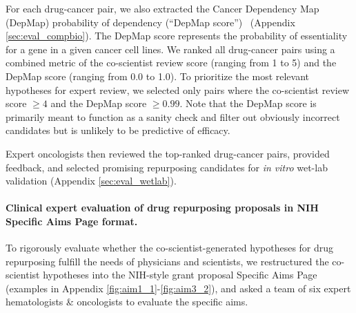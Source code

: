 For each drug-cancer pair, we also extracted the Cancer Dependency Map (DepMap) probability of dependency (``DepMap score'')~\citep{depmap2024} (Appendix \cref{sec:eval_compbio}). The DepMap score represents the probability of essentiality for a gene in a given cancer cell lines. We ranked all drug-cancer pairs using a combined metric of the co-scientist review score (ranging from 1 to 5) and the DepMap score (ranging from 0.0 to 1.0). To prioritize the most relevant hypotheses for expert review, we selected only pairs where the co-scientist review score $\geq 4$ and the DepMap score $\geq 0.99$. Note that the DepMap score is primarily meant to function as a sanity check and filter out obviously incorrect candidates but is unlikely to be predictive of efficacy.

Expert oncologists then reviewed the top-ranked drug-cancer pairs, provided feedback, and selected promising repurposing candidates for \textit{in vitro} wet-lab validation (Appendix \cref{sec:eval_wetlab}).

\paragraph{Clinical expert evaluation of drug repurposing proposals in NIH Specific Aims Page format.}
\label{sec:result_aims}
To rigorously evaluate whether the co-scientist-generated hypotheses for drug repurposing fulfill the needs of physicians and scientists, we restructured the co-scientist hypotheses into the NIH-style grant proposal Specific Aims Page (examples in Appendix \cref{fig:aim1_1}-\ref{fig:aim3_2}), and asked a team of six expert hematologists \& oncologists to evaluate the specific aims. 

